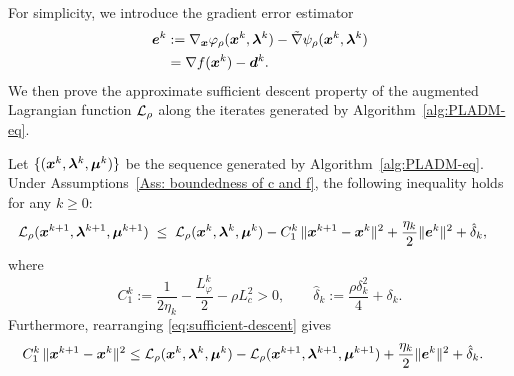 \documentclass[10pt]{article}
\begin{document}
For simplicity, we introduce the gradient error estimator
\begin{align}
    \bm{e}^k
    &:= \nabla_{\bm{x}}\varphi_{\rho}(\bm{x}^k,\bm{\lambda}^k)
    - \tilde{\nabla}\psi_{\rho}(\bm{x}^k,\bm{\lambda}^k) \notag\\
    &= \nabla f(\bm{x}^k) - \bm{d}^k.
\end{align}
We then prove the approximate sufficient descent property of the augmented Lagrangian function $\mathcal{L}_\rho$ along the iterates generated by Algorithm~\ref{alg:PLADM-eq}.   

\begin{lemma}
\label{lem:sufficient-descent}
Let $\{(\bm{x}^k, \bm{\lambda}^k, \bm{\mu}^k)\}$ be the sequence generated by
Algorithm~\ref{alg:PLADM-eq}. Under
Assumptions~\ref{Ass: boundedness of c and f}, the following inequality holds for any $k \ge 0$:
\begin{align}
  \mathcal{L}_{\rho}(\bm{x}^{k+1}, \bm{\lambda}^{k+1}, \bm{\mu}^{k+1})
  &\;\le\;
  \mathcal{L}_{\rho}(\bm{x}^k, \bm{\lambda}^k, \bm{\mu}^k)
  - C_1^k\,\|\bm{x}^{k+1}-\bm{x}^k\|^2
  + \frac{\eta_k}{2}\|\bm{e}^k\|^2
  + \hat\delta_k,
  \label{eq:sufficient-descent}
\end{align}
where
\begin{equation}\label{eq:C1-deltahat-def}
  C_1^k := \frac{1}{2\eta_k} - \frac{L_\varphi^k}{2} - \rho L_c^2 > 0,
  \qquad
  \hat\delta_k := \frac{\rho\delta_k^2}{4} + \delta_k.
\end{equation}
Furthermore, rearranging \eqref{eq:sufficient-descent} gives
\begin{align}\label{eq:descent-rearranged}
  C_1^k\,\|\bm{x}^{k+1}-\bm{x}^k\|^2
  \leq\;
  &\mathcal{L}_{\rho}(\bm{x}^k, \bm{\lambda}^k, \bm{\mu}^k)
  - \mathcal{L}_{\rho}(\bm{x}^{k+1}, \bm{\lambda}^{k+1}, \bm{\mu}^{k+1})
  + \frac{\eta_k}{2}\|\bm{e}^k\|^2
  + \hat\delta_k.
\end{align}
\end{lemma}
\end{document}

